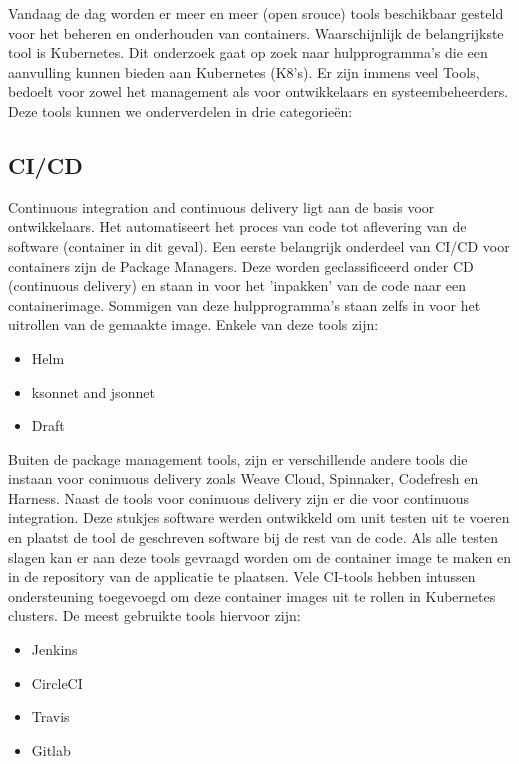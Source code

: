 Vandaag de dag worden er meer en meer (open srouce) tools beschikbaar gesteld voor het beheren en onderhouden van containers. Waarschijnlijk de belangrijkste tool is Kubernetes. Dit onderzoek gaat op zoek naar hulpprogramma's die een aanvulling kunnen bieden aan Kubernetes (K8's). Er zijn immens veel Tools, bedoelt voor zowel het management als voor ontwikkelaars en systeembeheerders. Deze tools kunnen we onderverdelen in drie categorieën:

\subsection{CI/CD}
Continuous integration and continuous delivery ligt aan de basis voor ontwikkelaars. Het automatiseert het proces van code tot aflevering van de software (container in dit geval). Een eerste belangrijk onderdeel van CI/CD voor containers zijn de Package Managers. Deze worden geclassificeerd onder CD (continuous delivery) en staan in voor het 'inpakken' van de code naar een containerimage. Sommigen van deze hulpprogramma's staan zelfs in voor het uitrollen van de gemaakte image. Enkele van deze tools zijn:
\begin{itemize}
    \item Helm
    \item ksonnet and jsonnet
    \item Draft
\end{itemize}
Buiten de package management tools, zijn er verschillende andere tools die instaan voor coninuous delivery zoals Weave Cloud, Spinnaker, Codefresh en Harness. Naast de tools voor coninuous delivery zijn er die voor continuous integration. Deze stukjes software werden ontwikkeld om unit testen uit te voeren en plaatst de tool de geschreven software bij de rest van de code. Als alle testen slagen kan er aan deze tools gevraagd worden om de container image te maken en in de repository van de applicatie te plaatsen. Vele CI-tools hebben intussen ondersteuning toegevoegd om deze container images uit te rollen in Kubernetes clusters. De meest gebruikte tools hiervoor zijn:
\begin{itemize}
    \item Jenkins
    \item CircleCI
    \item Travis
    \item Gitlab
\end{itemize}
